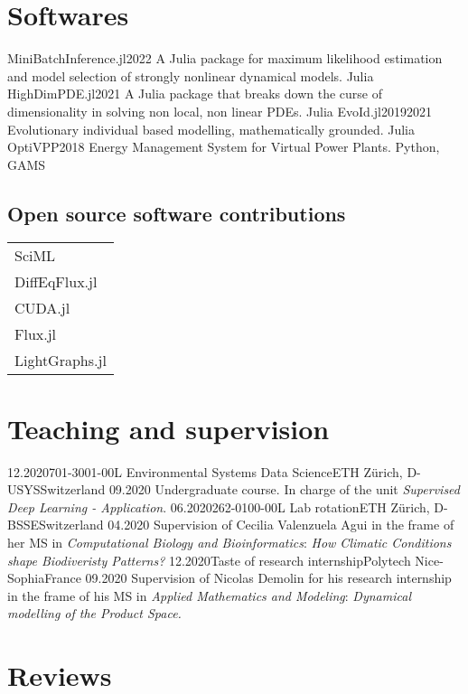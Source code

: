 \section*{Softwares}

\begin{projects}
	\project
	{MiniBatchInference.jl}{2022}
	{}
	{A Julia package for maximum likelihood estimation and model selection of strongly nonlinear dynamical models.}
	{Julia}
  \emptySeparator
	\project
	{HighDimPDE.jl}{2021}
	{ }
	{A Julia package that breaks down the curse of dimensionality in solving non local, non linear PDEs.}
	{Julia}
  \emptySeparator		
	\projectmy
	{EvoId.jl}{2019}{2021}
	{ }
	{Evolutionary individual based modelling, mathematically grounded.}
	{Julia}
  \emptySeparator
  \project
	{OptiVPP}{2018}
	{}
	{Energy Management System for Virtual Power Plants.}
	{Python, GAMS}
\end{projects}

\subsection*{Open source software contributions}
\begin{tabular}{l}
SciML\\
DiffEqFlux.jl\\ 
CUDA.jl\\ 
Flux.jl\\ 
LightGraphs.jl
\end{tabular}

\section*{Teaching and supervision}
\begin{experiences}
  \experienceshort
    {12.2020}{701-3001-00L Environmental Systems Data Science}{ETH Zürich, D-USYS}{Switzerland}
    {09.2020}
    {Undergraduate course. In charge of the unit \textit{Supervised Deep Learning - Application}.}
    \emptySeparator
  \experienceshort
    {06.2020}{262-0100-00L Lab rotation}{ETH Zürich, D-BSSE}{Switzerland}
    {04.2020}
    {Supervision of Cecilia Valenzuela Agui in the frame of her MS in \textit{Computational Biology and Bioinformatics}: \textit{How Climatic Conditions shape Biodiveristy Patterns?}}
    \emptySeparator
  \experienceshort
    {12.2020}{Taste of research internship}{Polytech Nice-Sophia}{France}
    {09.2020}
    {Supervision of Nicolas Demolin for his research internship in the frame of his MS in \textit{Applied Mathematics and Modeling}: \textit{Dynamical modelling of the Product Space.}}
\end{experiences}

\section*{Reviews}
\begin{experiences}
\end{experiences}
